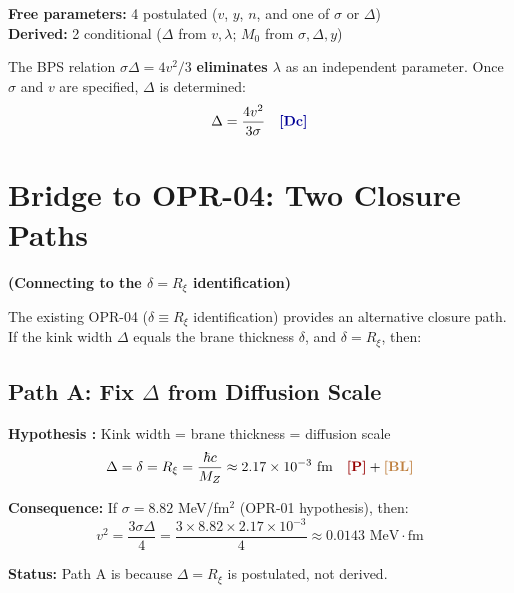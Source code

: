 \textbf{Free parameters:} 4 postulated ($v$, $y$, $n$, and one of $\sigma$ or $\Delta$) \\
\textbf{Derived:} 2 conditional ($\Delta$ from $v,\lambda$; $M_0$ from $\sigma,\Delta,y$)

\begin{tcolorbox}[colback=orange!5!white, colframe=orange!50!black,
    title=\textbf{Key Reduction}]
The BPS relation $\sigma\Delta = 4v^2/3$ \textbf{eliminates $\lambda$} as an
independent parameter. Once $\sigma$ and $v$ are specified, $\Delta$ is determined:
\begin{equation}
    \Delta = \frac{4 v^2}{3 \sigma}
    \quad \tagDc{}
    \label{eq:ch16:Delta_from_sigma_v}
\end{equation}
\end{tcolorbox}

\section{Bridge to OPR-04: Two Closure Paths}
\label{sec:ch16_bridge}
\noindent
\textbf{(Connecting to the $\delta = R_\xi$ identification)}

The existing OPR-04 ($\delta \equiv R_\xi$ identification) provides an alternative
closure path. If the kink width $\Delta$ equals the brane thickness $\delta$,
and $\delta = R_\xi$, then:

\subsection{Path A: Fix $\Delta$ from Diffusion Scale}
\label{subsec:ch16_pathA}

\begin{tcolorbox}[colback=red!5!white, colframe=red!50!black,
    title=\textbf{Closure Path A (OPR-04 identification)}]
\textbf{Hypothesis \tagP{}:} Kink width = brane thickness = diffusion scale
\begin{equation}
    \Delta = \delta = R_\xi = \frac{\hbar c}{M_Z} \approx 2.17 \times 10^{-3} \text{ fm}
    \quad \tagP{}+\tagBL{}
    \label{eq:ch16:Delta_Rxi}
\end{equation}

\textbf{Consequence:} If $\sigma = 8.82$ MeV/fm$^2$ (OPR-01 hypothesis), then:
\begin{equation}
    v^2 = \frac{3 \sigma \Delta}{4} = \frac{3 \times 8.82 \times 2.17 \times 10^{-3}}{4}
    \approx 0.0143 \text{ MeV} \cdot \text{fm}
\end{equation}

\textbf{Status:} Path A is \tagP{} because $\Delta = R_\xi$ is postulated, not derived.
\end{tcolorbox}

